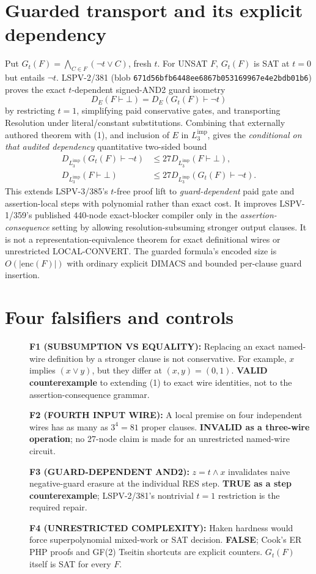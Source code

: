 \documentclass[11pt]{article}
\begin{document}
\section*{Guarded transport and its explicit dependency}
Put $G_t(F)=\bigwedge_{C\in F}(\neg t\lor C)$, fresh $t$. For UNSAT $F$, $G_t(F)$ is SAT at $t=0$ but entails $\neg t$. LSPV-2/381 (blob \texttt{671d56bfb6448ee6867b053169967e4e2bdb01b6}) proves the exact $t$-dependent signed-AND2 guard isometry
\[
D_E(F\vdash\bot)=D_E(G_t(F)\vdash\neg t)
\]
by restricting $t=1$, simplifying paid conservative gates, and transporting Resolution under literal/constant substitutions. Combining that externally authored theorem with (1), and inclusion of $E$ in $L_3^{\mathrm{imp}}$, gives the \emph{conditional on that audited dependency} quantitative two-sided bound
\[
\boxed{\begin{aligned}
D_{L_3^{\mathrm{imp}}}(G_t(F)\vdash\neg t)&\le27D_{L_3^{\mathrm{imp}}}(F\vdash\bot),\\
D_{L_3^{\mathrm{imp}}}(F\vdash\bot)&\le27D_{L_3^{\mathrm{imp}}}(G_t(F)\vdash\neg t).
\end{aligned}}\tag{2}
\]
This extends LSPV-3/385's $t$-free proof lift to \emph{guard-dependent} paid gate and assertion-local steps with polynomial rather than exact cost. It improves LSPV-1/359's published 440-node exact-blocker compiler only in the \emph{assertion-consequence} setting by allowing resolution-subsuming stronger output clauses. It is not a representation-equivalence theorem for exact definitional wires or unrestricted LOCAL-CONVERT. The guarded formula's encoded size is $O(|\mathrm{enc}(F)|)$ with ordinary explicit DIMACS and bounded per-clause guard insertion.

\section*{Four falsifiers and controls}
\begin{description}
\item[] \textbf{F1 (SUBSUMPTION VS EQUALITY):} Replacing an exact named-wire definition by a stronger clause is not conservative. For example, $x$ implies $(x\vee y)$, but they differ at $(x,y)=(0,1)$. \textbf{VALID counterexample} to extending (1) to exact wire identities, not to the assertion-consequence grammar.
\item[] \textbf{F2 (FOURTH INPUT WIRE):} A local premise on four independent wires has as many as $3^4=81$ proper clauses. \textbf{INVALID as a three-wire operation}; no 27-node claim is made for an unrestricted named-wire circuit.
\item[] \textbf{F3 (GUARD-DEPENDENT AND2):} $z=t\land x$ invalidates naive negative-guard erasure at the individual RES step. \textbf{TRUE as a step counterexample}; LSPV-2/381's nontrivial $t=1$ restriction is the required repair.
\item[] \textbf{F4 (UNRESTRICTED COMPLEXITY):} Haken hardness would force superpolynomial mixed-work or SAT decision. \textbf{FALSE}; Cook's ER PHP proofs and GF(2) Tseitin shortcuts are explicit counters. $G_t(F)$ itself is SAT for every $F$.
\end{description}
\end{document}

